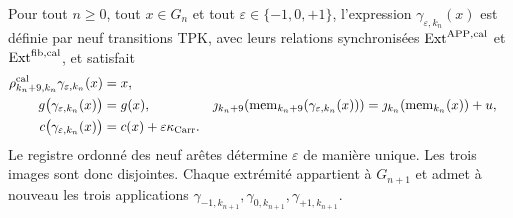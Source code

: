 \begin{lemma}
\label{hmtfg:lem:elevacion-catalogal-nonadica}
Pour tout \(n\ge0\), tout \(x\in G_n\) et tout \(\varepsilon\in\{-1,0,+1\}\), l'expression \(\gamma_{\varepsilon,k_n}(x)\) est définie par neuf transitions TPK, avec leurs relations synchronisées \(\operatorname{Ext}^{\mathrm{APP},\rm cal}\) et \(\operatorname{Ext}^{\rm fib,cal}\), et satisfait
\begin{align}
 \rho^{\rm cal}_{k_n+9,k_n}\gamma_{\varepsilon,k_n}(x)&=x,
 \label{hmtfg:eq:truncamiento-injerto-ch}\\
 g\bigl(\gamma_{\varepsilon,k_n}(x)\bigr)
   &=g(x),&
 \jmath_{k_n+9}\!\left(\operatorname{mem}_{k_n+9}
        (\gamma_{\varepsilon,k_n}(x))\right)
   &=\jmath_{k_n}\!\left(\operatorname{mem}_{k_n}(x)\right)+u,
 \label{hmtfg:eq:fase-memoria-injerto-ch}\\
 c\bigl(\gamma_{\varepsilon,k_n}(x)\bigr)
   &=c(x)+\varepsilon\kappa_{\rm Carr}.&&
 \label{hmtfg:eq:carry-injerto-ch}
\end{align}
\label{hmtfg:eq:tres-vueltas-propiedades-ch}
\label{hmtfg:eq:tres-vueltas-acarreo-ch}
Le registre ordonné des neuf arêtes détermine \(\varepsilon\) de manière unique. Les trois images sont donc disjointes. Chaque extrémité appartient à \(G_{n+1}\) et admet à nouveau les trois applications \(\gamma_{-1,k_{n+1}},\gamma_{0,k_{n+1}},
\gamma_{+1,k_{n+1}}\).
\end{lemma}

